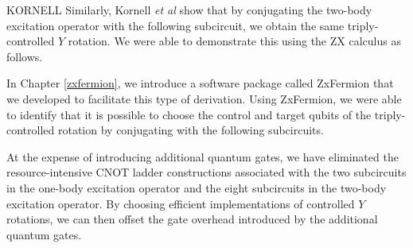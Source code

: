 KORNELL
Similarly, Kornell \textit{et al} \cite{Kornell2023} show that by conjugating the two-body excitation operator with the following subcircuit, we obtain the same triply-controlled $Y$ rotation. We were able to demonstrate this using the ZX calculus as follows.


In Chapter \ref{zxfermion}, we introduce a software package called ZxFermion that we developed to facilitate this type of derivation. Using ZxFermion, we were able to identify that it is possible to choose the control and target qubits of the triply-controlled rotation by conjugating with the following subcircuits.





At the expense of introducing additional quantum gates, we have eliminated the resource-intensive CNOT ladder constructions associated with the two subcircuits in the one-body excitation operator and the eight subcircuits in the two-body excitation operator. By choosing efficient implementations of controlled $Y$ rotations, we can then offset the gate overhead introduced by the additional quantum gates.

